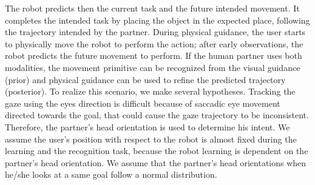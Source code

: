 \documentclass[runningheads,a4paper]{llncs}
\begin{document}
 The robot predicts then the current task and the future intended movement. It completes the intended task by placing the object in the expected place, following the trajectory intended by the partner. During physical guidance, the user starts to physically move the robot to perform the action; after early observations, the robot predicts the future movement to perform. If the human partner uses both modalities, the movement primitive can be recognized from the visual guidance (prior) and physical guidance can be used to refine the predicted trajectory (posterior). 
To realize this scenario, we make several hypotheses. 
Tracking the gaze using the eyes direction is difficult because of saccadic eye movement directed towards the goal, that could cause the gaze trajectory to be inconsistent. Therefore, the partner's head orientation is used to determine his intent. We assume the user's position with respect to the robot is almost fixed during the learning and the recognition task, because the robot learning is dependent on the partner's head orientation. We assume that the partner's head orientations when he/she looks at a same goal follow a normal distribution. 
\end{document}
